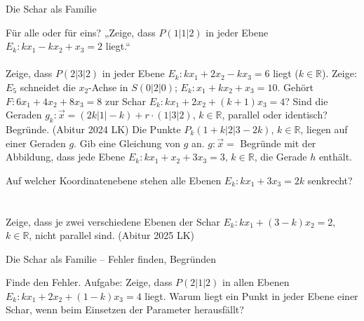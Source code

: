 \begin{aufgabe}{Die Schar als Familie}
\begin{teile}
\teil Für alle oder für eins? „Zeige, dass $P(1 | 1 | 2)$ in jeder Ebene $E_k: k x_1 - k x_2 + x_3 = 2$ liegt.“ \\  \\ 
\teil Zeige, dass $P(2 | 3 | 2)$ in jeder Ebene $E_k: k x_1 + 2x_2 - k x_3 = 6$ liegt ($k \in \mathbb{R}$).
\teil Zeige: $E_5$ schneidet die $x_2$-Achse in $S(0 | 2 | 0)$; $E_k: x_1 + k x_2 + x_3 = 10$.
\teil Gehört $F: 6x_1 + 4x_2 + 8x_3 = 8$ zur Schar $E_k: k x_1 + 2x_2 + (k + 1) x_3 = 4$?
\teil Sind die Geraden $g_k: \vec{x} = (2k | 1 | -k) + r \cdot (1 | 3 | 2)$, $k \in \mathbb{R}$, parallel oder identisch? Begründe. \hfill (Abitur 2024 LK)
\teil Die Punkte $P_k(1 + k | 2 | 3 - 2k)$, $k \in \mathbb{R}$, liegen auf einer Geraden $g$. Gib eine Gleichung von $g$ an. $g: \vec{x} = $ \leerfeld
\teil Begründe mit der Abbildung, dass jede Ebene $E_k: k x_1 + x_2 + 3x_3 = 3$, $k \in \mathbb{R}$, die Gerade $h$ enthält.

\begin{ksys3}\end{ksys3}
\teil Auf welcher Koordinatenebene stehen alle Ebenen $E_k: k x_1 + 3x_3 = 2k$ senkrecht? \\  \\  \\ 
\teil Zeige, dass je zwei verschiedene Ebenen der Schar $E_k: k x_1 + (3 - k) x_2 = 2$, $k \in \mathbb{R}$, nicht parallel sind. \hfill (Abitur 2025 LK)
\end{teile}
\end{aufgabe}

\begin{aufgabe}{Die Schar als Familie – Fehler finden, Begründen}
\begin{teile}
\teil Finde den Fehler. Aufgabe: Zeige, dass $P(2 | 1 | 2)$ in allen Ebenen $E_k: k x_1 + 2x_2 + (1 - k) x_3 = 4$ liegt. 
\teil Warum liegt ein Punkt in jeder Ebene einer Schar, wenn beim Einsetzen der Parameter herausfällt?
\end{teile}
\end{aufgabe}
